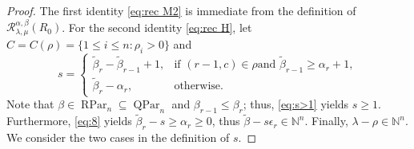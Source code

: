 \documentclass[12pt]{amsart}
\numberwithin{equation}{section}
\theoremstyle{definition}
\newcommand\wb{\widetilde{\beta}}
\newcommand\NN{\mathbb{N}}
\newcommand\RPar{\operatorname{RPar}}
\newcommand\QPar{\operatorname{QPar}}
\newcommand\R{\mathcal{R}}
\begin{document}
\begin{proof}
  The first identity \eqref{eq:rec M2} is immediate from the definition of
  $\R^{\alpha,\beta}_{\lambda,\mu}(R_0)$. For the second identity \eqref{eq:rec
    H}, let $C=C(\rho)=\{1\le i\le n: \rho_i>0\}$ and
    \[
s = \begin{cases}
  \wb_r-\wb_{r-1}+1, & \mbox{if $(r-1,c)\in\rho$
  and $\wb_{r-1}\ge\alpha_r+1$} ,\\
\wb_r-\alpha_r, &\mbox{otherwise} .
\end{cases}
  \]
  Note that $\beta \in \RPar_n \subseteq \QPar_n$ and
  $\beta_{r-1} \leq \beta_r$; thus, \eqref{eq:s>1} yields
  $s \ge 1$.
  Furthermore, \eqref{eq:8} yields
  $\wb_r - s \ge \alpha_r \ge 0$, thus
  $\wb - s \epsilon_r \in \NN^n$. Finally,
  $\lambda - \rho \in \NN^n$.
  We consider the two cases in the definition of $s$.


\end{proof}
\end{document}
